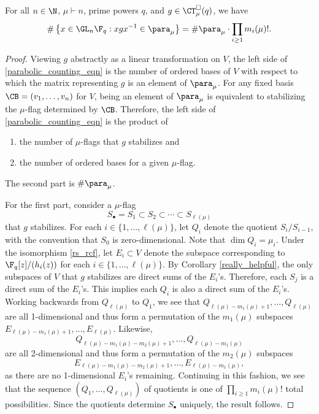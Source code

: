 \begin{lemma}
\label{parabolic_counting_lemma}
For all \(n \in \N\), $\mu \vdash n$, prime powers \(q\), and $g \in \CT_\mu^\Box (q)$, we have
\begin{equation} \label{parabolic_counting_eqn} \# \left \{ x \in \GL_n \F_q : xgx^{-1} \in \para_\mu \right \} = \# \para_\mu \cdot \prod_{i \geq 1} m_i(\mu)! .\end{equation}
\end{lemma}
\begin{proof}
Viewing \(g\) abstractly as a linear transformation on \(V\), the left side of \eqref{parabolic_counting_eqn} is the number of ordered bases of $V$ with respect to which the matrix representing $g$ is an element of $\para_\mu$.
For any fixed basis $\CB = (v_1,\ldots,v_{n})$ for $V$, being an element of $\para_\mu$ is equivalent to stabilizing the $\mu$-flag determined by $\CB$.
Therefore, the left side of \eqref{parabolic_counting_eqn} is the product of
\begin{enumerate}[(1)]
\item the number of $\mu$-flags that $g$ stabilizes and
\item the number of ordered bases for a given $\mu$-flag.
\end{enumerate}
The second part is $\# \para_\mu$.

For the first part, consider a $\mu$-flag
$$ S_\bullet = S_1 \subset S_2 \subset \cdots \subset S_{\ell(\mu)}$$
that $g$ stabilizes.
For each \(i \in \{1,\ldots,\ell(\mu)\}\), let \(Q_i\) denote the quotient \(S_i / S_{i-1}\), with the convention that \(S_0\) is zero-dimensional.
Note that \(\dim Q_i = \mu_i\).
Under the isomorphism \eqref{rs_rcf}, let \(E_i \subset V\) denote the subspace corresponding to \(\F_q[z] / (h_i(z))\) for each \(i \in \{1,\ldots,\ell(\mu)\}\).
By Corollary \ref{really_helpful}, the only subspaces of $V$ that $g$ stabilizes are direct sums of the $E_i$'s.
Therefore, each $S_j$ is a direct sum of the $E_i$'s.
This implies each $Q_i$ is also a direct sum of the $E_i$'s.
Working backwards from \(Q_{\ell(\mu)}\) to \(Q_1\), we see that
\(
Q_{\ell(\mu)-m_1(\mu)+1},
\ldots,
Q_{\ell(\mu)}
\) are all 1-dimensional
and thus form a permutation of the \(m_1(\mu)\) subspaces
\(
E_{\ell(\mu)-m_1(\mu)+1},
\ldots,
E_{\ell(\mu)}
\).
Likewise,
\[
Q_{\ell(\mu)-m_1(\mu)-m_2(\mu)+1},
\ldots,
Q_{\ell(\mu)-m_1(\mu)}
\]
are all 2-dimensional and thus form a permutation of the \(m_2(\mu)\) subspaces
\[
E_{\ell(\mu)-m_1(\mu)-m_2(\mu)+1},
\ldots,
E_{\ell(\mu)-m_1(\mu)},
\]
as there are no 1-dimensional \(E_i\)'s remaining.
Continuing in this fashion, we see that the sequence \((Q_1,\ldots,Q_{\ell(\mu)})\) of quotients is one of \(\prod_{i \geq 1} m_i(\mu)!\) total possibilities.
Since the quotients determine \(S_\bullet\) uniquely, the result follows.
\end{proof}

